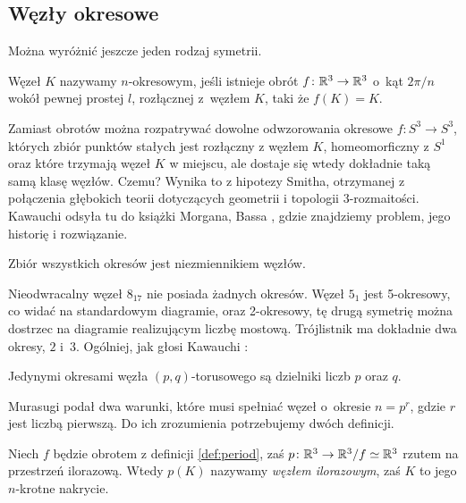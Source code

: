 
\subsection{Węzły okresowe}
%
Można wyróżnić jeszcze jeden rodzaj symetrii.

\begin{definition}
\label{def:period}%
    Węzeł $K$ nazywamy $n$-okresowym, jeśli istnieje obrót $f \colon \mathbb R^3 \to \mathbb R^3$ o~kąt $2\pi/n$ wokół pewnej prostej $l$, rozłącznej z~węzłem $K$, taki że $f(K) = K$.
\end{definition}

Zamiast obrotów można rozpatrywać dowolne odwzorowania okresowe $f \colon S^3 \to S^3$, których zbiór punktów stałych jest rozłączny z węzłem $K$, homeomorficzny z $S^1$ oraz które trzymają węzeł $K$ w miejscu, ale dostaje się wtedy dokładnie taką samą klasę węzłów.
Czemu?
Wynika to z hipotezy Smitha, otrzymanej z połączenia głębokich teorii dotyczących geometrii i topologii 3-rozmaitości.
%
Kawauchi \cite[s. 125]{kawauchi1996} odsyła tu do książki Morgana, Bassa \cite{morgan1984}, gdzie znajdziemy problem, jego historię i rozwiązanie.
%
%

\begin{proposition}
    Zbiór wszystkich okresów jest niezmiennikiem węzłów.
\end{proposition}

Nieodwracalny węzeł $8_{17}$ nie posiada żadnych okresów.
Węzeł $5_1$ jest 5-okresowy, co widać na standardowym diagramie, oraz 2-okresowy, tę drugą symetrię można dostrzec na diagramie realizującym liczbę mostową.
Trójlistnik ma dokładnie dwa okresy, $2$ i~$3$.
Ogólniej, jak głosi Kawauchi \cite[ćwiczenie 10.1.9]{kawauchi1996}:

\begin{proposition}
    Jedynymi okresami węzła $(p, q)$-torusowego są dzielniki liczb $p$ oraz $q$.
\end{proposition}

Murasugi podał dwa warunki, które musi spełniać węzeł o~okresie $n = p^r$, gdzie $r$ jest liczbą pierwszą.
Do ich zrozumienia potrzebujemy dwóch definicji.

\begin{definition}
    Niech $f$ będzie obrotem z definicji \ref{def:period}, zaś $p \colon \mathbb R^3 \to \mathbb R^3/f \simeq \mathbb R^3$ rzutem na przestrzeń ilorazową.
%
    Wtedy $p(K)$ nazywamy \emph{węzłem ilorazowym}, zaś $K$ to jego $n$-krotne nakrycie.    
\end{definition}

